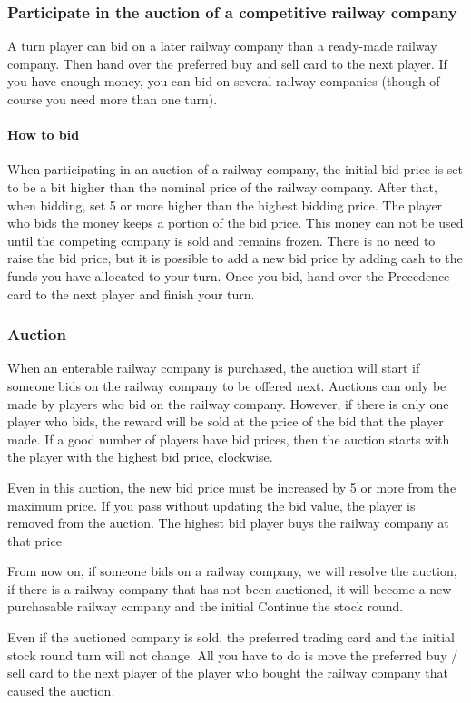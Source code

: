 \documentclass{article}
\begin{document}
\begin{CJK}{UTF8}{min}
\subsubsection{Participate in the auction of a competitive railway company}
A turn player can bid on a later railway company than a ready-made
railway company. Then hand over the preferred buy and sell card to the
next player. If you have enough money, you can bid on several railway
companies (though of course you need more than one turn).

\paragraph{How to bid}
When participating in an auction of a railway company, the initial bid
price is set to be a bit higher than the nominal price of the railway
company. After that, when bidding, set 5 or more higher than the
highest bidding price. The player who bids the money keeps a portion
of the bid price. This money can not be used until the competing
company is sold and remains frozen. There is no need to raise the bid
price, but it is possible to add a new bid price by adding cash to the
funds you have allocated to your turn. Once you bid, hand over the
Precedence card to the next player and finish your turn.

\subsubsection{Auction}
When an enterable railway company is purchased, the auction will start
if someone bids on the railway company to be offered next. Auctions
can only be made by players who bid on the railway company. However,
if there is only one player who bids, the reward will be sold at the
price of the bid that the player made. If a good number of players
have bid prices, then the auction starts with the player with the
highest bid price, clockwise.

Even in this auction, the new bid price must be increased by 5 or more
from the maximum price. If you pass without updating the bid value,
the player is removed from the auction. The highest bid player buys
the railway company at that price

From now on, if someone bids on a railway company, we will resolve the
auction, if there is a railway company that has not been auctioned, it
will become a new purchasable railway company and the initial Continue
the stock round.

Even if the auctioned company is sold, the preferred trading card and
the initial stock round turn will not change. All you have to do is
move the preferred buy / sell card to the next player of the player
who bought the railway company that caused the auction.


\end{CJK}
\end{document}
